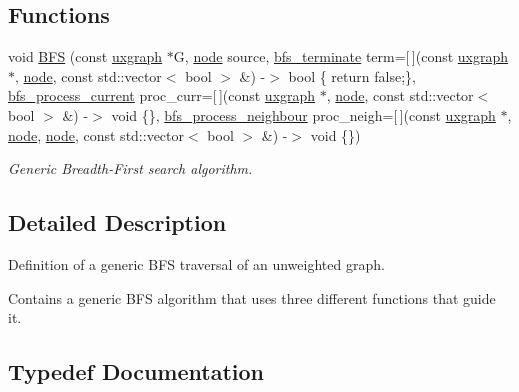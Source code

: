 \subsection*{Functions}
\begin{DoxyCompactItemize}
\item 
void \hyperlink{namespacelgraph_1_1traversal_1_1bfs_aacedf978cd98feee134e7e1e4e099f37}{B\+FS} (const \hyperlink{classlgraph_1_1uxgraph}{uxgraph} $\ast$G, \hyperlink{namespacelgraph_a397169dd66adf725210a30fb7251773e}{node} source, \hyperlink{namespacelgraph_1_1traversal_1_1bfs_aa4593f688322861facc9f6851df5dd01}{bfs\+\_\+terminate} term=\mbox{[}$\,$\mbox{]}(const \hyperlink{classlgraph_1_1uxgraph}{uxgraph} $\ast$, \hyperlink{namespacelgraph_a397169dd66adf725210a30fb7251773e}{node}, const std\+::vector$<$ bool $>$ \&) -\/$>$ bool \{ return false;\}, \hyperlink{namespacelgraph_1_1traversal_1_1bfs_afe3126045b7607bea056d250cfcc4aba}{bfs\+\_\+process\+\_\+current} proc\+\_\+curr=\mbox{[}$\,$\mbox{]}(const \hyperlink{classlgraph_1_1uxgraph}{uxgraph} $\ast$, \hyperlink{namespacelgraph_a397169dd66adf725210a30fb7251773e}{node}, const std\+::vector$<$ bool $>$ \&) -\/$>$ void \{\}, \hyperlink{namespacelgraph_1_1traversal_1_1bfs_ae7d59c83c3c9fd50ed4afd8ed781bca9}{bfs\+\_\+process\+\_\+neighbour} proc\+\_\+neigh=\mbox{[}$\,$\mbox{]}(const \hyperlink{classlgraph_1_1uxgraph}{uxgraph} $\ast$, \hyperlink{namespacelgraph_a397169dd66adf725210a30fb7251773e}{node}, \hyperlink{namespacelgraph_a397169dd66adf725210a30fb7251773e}{node}, const std\+::vector$<$ bool $>$ \&) -\/$>$ void \{\})
\begin{DoxyCompactList}\small\item\em Generic Breadth-\/\+First search algorithm. \end{DoxyCompactList}\end{DoxyCompactItemize}


\subsection{Detailed Description}
Definition of a generic B\+FS traversal of an unweighted graph. 

Contains a generic B\+FS algorithm that uses three different functions that guide it. 

\subsection{Typedef Documentation}
\mbox{\label{namespacelgraph_1_1traversal_1_1bfs_afe3126045b7607bea056d250cfcc4aba}} 
